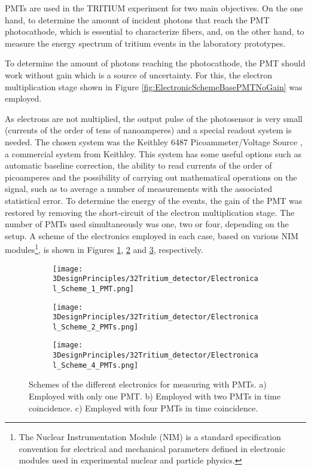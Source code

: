 PMTs are used in the TRITIUM experiment for two main objectives. On the one hand, to determine the amount of incident photons that reach the PMT photocathode, which is essential to characterize fibers, and, on the other hand, to measure the energy spectrum of tritium events in the laboratory prototypes.

To determine the amount of photons reaching the photocathode, the PMT should work without gain which is a source of uncertainty. For this, the electron multiplication stage shown in Figure \ref{fig:ElectronicSchemeBasePMTNoGain} was employed. 

As electrons are not multiplied, the output pulse of the photosensor is very small (currents of the order of tens of nanoamperes) and a special readout system is needed. The chosen system was the Keithley 6487 Picoammeter/Voltage Source \cite{DataSheetKeithley6487}, a commercial system from Keithley. This system has some useful options such as automatic baseline correction, the ability to read currents of the order of picoamperes and the possibility of carrying out mathematical operations on the signal, such as to average a number of measurements with the associated statistical error. To determine the energy of the events, the gain of the PMT was restored by removing the short-circuit of the electron multiplication stage. The number of PMTs used simultaneously was one, two or four, depending on the setup. A scheme of the electronics employed in each case, based on various NIM modules\footnote{The Nuclear Instrumentation Module (NIM) is a standard specification convention for electrical and mechanical parameters defined in electronic modules used in experimental nuclear and particle physics.}, is shown in Figures \ref{subfig:ElectronicConfiguraiton1PMT}, \ref{subfig:ElectronicConfiguraiton2PMT} and \ref{subfig:ElectronicConfiguraiton4PMT}, respectively.

\begin{figure}
\centering
    \begin{subfigure}[b]{1.0\textwidth}
    \centering
    \texttt{[image: 3DesignPrinciples/32Tritium\_detector/Electronical\_Scheme\_1\_PMT.png]}  
    \caption{\label{subfig:ElectronicConfiguraiton1PMT}}
    \end{subfigure}
    \hfill
    \begin{subfigure}[b]{1.0\textwidth}
    \centering
    \texttt{[image: 3DesignPrinciples/32Tritium\_detector/Electronical\_Scheme\_2\_PMTs.png]}  
    \caption{\label{subfig:ElectronicConfiguraiton2PMT}}
    \end{subfigure}
    \hfill
    \begin{subfigure}[b]{1.0\textwidth}
    \centering
    \texttt{[image: 3DesignPrinciples/32Tritium\_detector/Electronical\_Scheme\_4\_PMTs.png]}  
    \caption{\label{subfig:ElectronicConfiguraiton4PMT}}
    \end{subfigure}
 \caption{Schemes of the different electronics for measuring with PMTs. a) Employed with only one PMT. b) Employed with two PMTs in time coincidence. c) Employed with four PMTs in time coincidence.}
 \label{fig:ElectronicConfiguraitonsPMT}
\end{figure}

